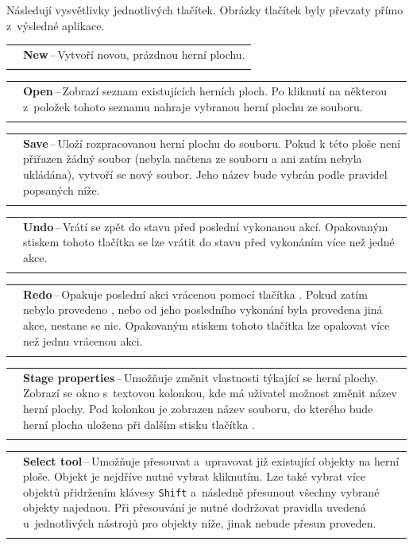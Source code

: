 \newcommand{\describeeditorbutton}[3]{
\noindent\begin{tabularx}{\textwidth}{lX}
    \scalebox{2}{\texttt{[image: \#2]}} & \textbf{#1}\,--\,#3 \\
    \\
\end{tabularx}
}

Následují vysvětlivky jednotlivých tlačítek. Obrázky tlačítek byly převzaty přímo z~výsledné aplikace.\\

\describeeditorbutton{New}{obrazky-figures/new.png}{Vytvoří novou, prázdnou herní plochu.}

\describeeditorbutton{Open}{obrazky-figures/open.png}{Zobrazí seznam existujících herních ploch. Po kliknutí na některou z~položek tohoto seznamu nahraje vybranou herní plochu ze souboru.}

\describeeditorbutton{Save}{obrazky-figures/save.png}{Uloží rozpracovanou herní plochu do souboru. Pokud k této ploše není přiřazen žádný soubor (nebyla načtena ze souboru a ani zatím nebyla ukládána), vytvoří se nový soubor. Jeho název bude vybrán podle pravidel popsaných níže.}

\describeeditorbutton{Undo}{obrazky-figures/undo.png}{Vrátí se zpět do stavu před poslední vykonanou akcí. Opakovaným stiskem tohoto tlačítka se lze vrátit do stavu před vykonáním více než jedné akce.}

\describeeditorbutton{Redo}{obrazky-figures/redo.png}{Opakuje poslední akci vrácenou pomocí tlačítka \uv{Undo}. Pokud zatím nebylo provedeno \uv{undo}, nebo od jeho posledního vykonání byla provedena jiná akce, nestane se nic. Opakovaným stiskem tohoto tlačítka lze opakovat více než jednu vrácenou akci.}

\describeeditorbutton{Stage properties}{obrazky-figures/cogwheel.png}{Umožňuje změnit vlastnosti týkající se herní plochy. Zobrazí se okno s~textovou kolonkou, kde má uživatel možnost změnit název herní plochy. Pod kolonkou je zobrazen název souboru, do kterého bude herní plocha uložena při dalším stisku tlačítka \uv{Save}.}

\describeeditorbutton{Select tool}{obrazky-figures/select-tool.png}{Umožňuje přesouvat a~upravovat již existující objekty na herní ploše. Objekt je nejdříve nutné vybrat kliknutím. Lze také vybrat více objektů přidržením klávesy \texttt{Shift} a~následně přesunout všechny vybrané objekty najednou. Při přesouvání je nutné dodržovat pravidla uvedená u~jednotlivých nástrojů pro objekty níže, jinak nebude přesun proveden.}

